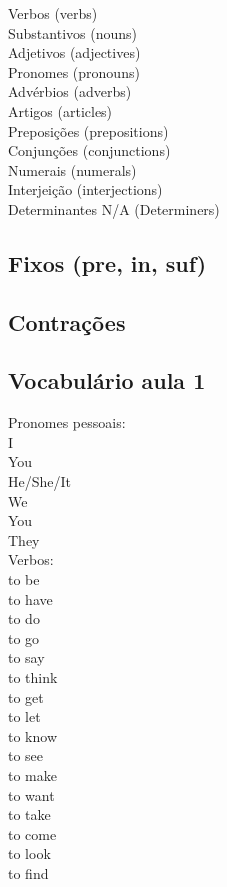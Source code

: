\documentclass[12pt,a4paper]{article} %
\begin{document}
Verbos (verbs)\\
Substantivos (nouns)\\
Adjetivos (adjectives)\\
Pronomes (pronouns)\\
Advérbios (adverbs)\\
Artigos (articles)\\
Preposições (prepositions)\\
Conjunções (conjunctions)\\
Numerais (numerals)\\
Interjeição (interjections)\\
Determinantes N/A (Determiners)\\

\subsection{Fixos (pre, in, suf)}

\subsection{Contrações}

\subsection{Vocabulário aula 1}

Pronomes pessoais:\\

I\\
You\\
He/She/It\\
We\\
You\\
They\\

Verbos:\\

to be\\
to have\\
to do\\
to go\\
to say\\
to think\\
to get\\
to let\\
to know\\
to see\\
to make\\
to want\\
to take\\
to come\\
to look\\
to find\\
\end{document}
